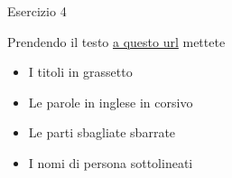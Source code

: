 \begin{frame}{Esercizio 4}

Prendendo il testo \href{http://www.google.it}{a questo url} mettete
\begin{itemize}
\item I titoli in grassetto
\item Le parole in inglese in corsivo
\item Le parti sbagliate sbarrate
\item I nomi di persona sottolineati
\end{itemize}

\end{frame}